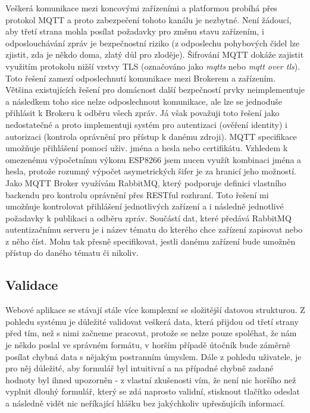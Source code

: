 Veškerá komunikace mezi koncovými zařízeními a platformou probíhá přes protokol MQTT a proto zabezpečení tohoto kanálu je nezbytné. Není žádoucí, aby třetí strana mohla posílat požadavky pro změnu stavu zařízením, i odposlouchávání zpráv je bezpečnostní riziko (z odposlechu pohybových čidel lze zjistit, zda je někdo doma, zlatý důl pro zloděje). Šifrování MQTT dokáže zajistit využitím protokolu nižší vrstvy TLS (označováno jako \textit{mqtts} nebo \textit{mqtt over tls}). Toto řešení zamezí odposlechnutí komunikace mezi Brokerem a zařízením. Většina existujících řešení pro domácnost další bezpečností prvky neimplementuje a následkem toho sice nelze odposlechnout komunikace, ale lze se jednoduše přihlásit k Brokeru k odběru všech zpráv. Já však považuji toto řešení jako nedostatečné a proto implementuji systém pro autentizaci (ověření identity) i autorizaci (kontrola oprávnění pro přístup k danému zdroji). MQTT specifikace umožňuje přihlášení pomocí uživ. jména a hesla nebo certifikátu. Vzhledem k omezenému výpočetnímu výkonu ESP8266 jsem nucen využít kombinaci jména a hesla, protože rozumný výpočet asymetrických šifer je za hranicí jeho možností. Jako MQTT Broker využívám RabbitMQ, který podporuje definici vlastního backendu pro kontrolu oprávnění přes RESTful rozhraní. Toto řešení mi umožňuje kontrolovat přihlášení jednotlivých zařízení a i následně jednotlivé požadavky k publikaci a odběru zpráv. Součástí dat, které předává RabbitMQ autentizačnímu serveru je i název tématu do kterého chce zařízení zapisovat nebo z něho číst. Mohu tak přesně specifikovat, jestli danému zařízení bude umožněn přístup do daného tématu či nikoliv.

\subsection{Validace}
\label{BE:Validace}
Webové aplikace se stávají stále více komplexní se složitější datovou strukturou. Z pohledu systému je důležité validovat veškerá data, která přijdou od třetí strany před tím, než s nimi začneme pracovat, protože se nelze pouze spoléhat, že nám je někdo poslal ve správném formátu, v horším případě útočník bude záměrně posílat chybná data s nějakým postranním úmyslem. Dále z pohledu uživatele, je pro něj důležité, aby formulář byl intuitivní a na případné chybně zadané hodnoty byl ihned upozorněn - z vlastní zkušenosti vím, že není nic horšího než vyplnit dlouhý formulář, který se zdá naprosto validní, stisknout tlačítko odeslat a následně vidět nic neříkající hlášku  bez jakýchkoliv upřesňujícíh informací.

